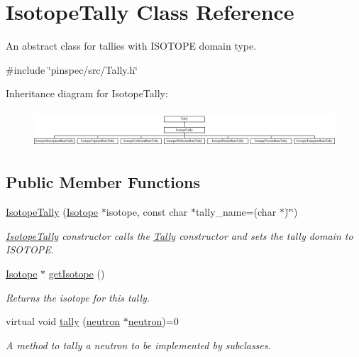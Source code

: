 \hypertarget{classIsotopeTally}{\section{Isotope\-Tally Class Reference}
\label{classIsotopeTally}
}


An abstract class for tallies with I\-S\-O\-T\-O\-P\-E domain type.  




{\ttfamily \#include \char`\"{}pinspec/src/\-Tally.\-h\char`\"{}}

Inheritance diagram for Isotope\-Tally\-:\begin{figure}[H]
\begin{center}
\leavevmode
\includegraphics[height=1.387283cm]{classIsotopeTally}
\end{center}
\end{figure}
\subsection*{Public Member Functions}
\begin{DoxyCompactItemize}
\item 
\hyperlink{classIsotopeTally_a99b6c5ff93bcab9176d9cd7bc561617e}{Isotope\-Tally} (\hyperlink{classIsotope}{Isotope} $\ast$isotope, const char $\ast$tally\-\_\-name=(char $\ast$)\char`\"{}\char`\"{})
\begin{DoxyCompactList}\small\item\em \hyperlink{classIsotopeTally}{Isotope\-Tally} constructor calls the \hyperlink{classTally}{Tally} constructor and sets the tally domain to I\-S\-O\-T\-O\-P\-E. \end{DoxyCompactList}\item 
\hyperlink{classIsotope}{Isotope} $\ast$ \hyperlink{classIsotopeTally_a7dbed38017c97998a9f3bd1560ecf750}{get\-Isotope} ()
\begin{DoxyCompactList}\small\item\em Returns the isotope for this tally. \end{DoxyCompactList}\item 
\hypertarget{classIsotopeTally_a8a5b190e244c630ee7cda35f70287530}{virtual void \hyperlink{classIsotopeTally_a8a5b190e244c630ee7cda35f70287530}{tally} (\hyperlink{structneutron}{neutron} $\ast$\hyperlink{structneutron}{neutron})=0}\label{classIsotopeTally_a8a5b190e244c630ee7cda35f70287530}

\begin{DoxyCompactList}\small\item\em A method to tally a neutron to be implemented by subclasses. \end{DoxyCompactList}\end{DoxyCompactItemize}
